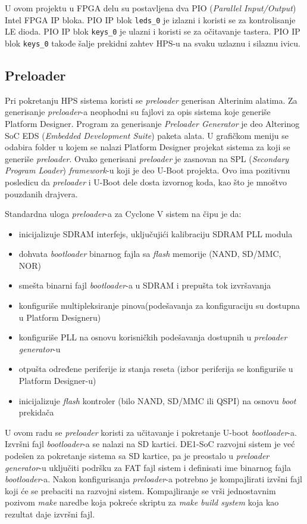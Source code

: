 U ovom projektu u FPGA delu su postavljena dva PIO (\textit{Parallel Input/Output}) Intel FPGA IP bloka. PIO IP blok \texttt{leds\_0} je izlazni i koristi se za kontrolisanje LE dioda. PIO IP blok \texttt{keys\_0} je ulazni i koristi se za očitavanje tastera. PIO IP blok \texttt{keys\_0} takođe šalje prekidni zahtev HPS-u na svaku uzlaznu i silaznu ivicu.

\subsection{Preloader}
Pri pokretanju HPS sistema koristi se \textit{preloader} generisan Alterinim alatima. Za generisanje \textit{preloader}-a neophodni su fajlovi za opis sistema koje generiše Platform Designer. Program za generisanje \textit{Preloader Generator} je deo Alterinog SoC EDS (\textit{Embedded Development Suite}) paketa alata. U grafičkom meniju se odabira folder u kojem se nalazi Platform Designer projekat sistema za koji se generiše \textit{preloader}. Ovako generisani \textit{preloader} je zasnovan na SPL (\textit{Secondary Program Loader}) \textit{framework}-u koji je deo U-Boot projekta. Ovo ima pozitivnu posledicu da \textit{preloader} i U-Boot dele dosta izvornog koda, kao što je mnoštvo pouzdanih drajvera.

Standardna uloga \textit{preloader}-a za Cyclone V sistem na čipu je da:
\begin{itemize}
\item inicijalizuje SDRAM interfejs, uključujići kalibraciju SDRAM PLL modula
\item dohvata \textit{bootloader} binarnog fajla sa \textit{flash} memorije (NAND, SD/MMC, NOR)
\item smešta binarni fajl \textit{bootloader}-a u SDRAM i prepušta tok izvršavanja
\item konfiguriše multipleksiranje pinova(podešavanja za konfiguraciju su dostupna u Platform Designeru)
\item konfiguriše PLL na osnovu korisničkih podešavanja dostupnih u \textit{preloader generator}-u
\item otpušta određene periferije iz stanja reseta (izbor periferija se konfiguriše u Platform Designer-u)
\item inicijalizuje \textit{flash} kontroler (bilo NAND, SD/MMC ili QSPI) na osnovu \textit{boot} prekidača
\end{itemize}

U ovom radu se \textit{preloader} koristi za učitavanje i pokretanje U-boot \textit{bootloader}-a. Izvršni fajl \textit{bootloader}-a se nalazi na SD kartici. DE1-SoC razvojni sistem je već podešen za pokretanje sistema sa SD kartice, pa je preostalo u \textit{preloader generator}-u uključiti podršku za FAT fajl sistem i definisati ime binarnog fajla \textit{bootloader}-a. Nakon konfigurisanja \textit{preloader}-a potrebno je kompajlirati izvšni fajl koji će se prebaciti na razvojni sistem. Kompajliranje se vrši jednostavnim pozivom \textit{make} naredbe koja pokreće skriptu za \textit{make build system} koja kao rezultat daje izvršni fajl.

